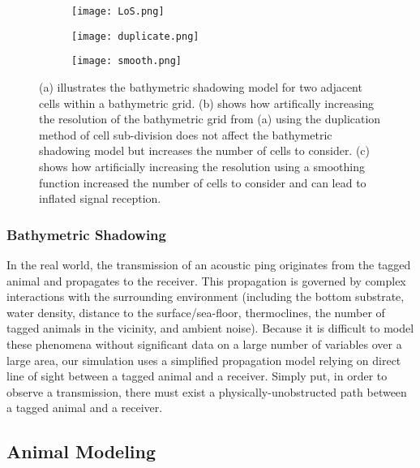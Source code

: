 \begin{figure}[ht]
	\begin{subfigure}{.5\textwidth}
		\centering
		\texttt{[image: LoS.png]}
		\caption{
			\label{resolutionScale}}
		\label{LoS}
	\end{subfigure}%
	\begin{subfigure}{.5\textwidth}
		\centering
		\texttt{[image: duplicate.png]}
		\caption{
			\label{duplicate}}
	\end{subfigure}
	\begin{subfigure}{.5\textwidth}
		\centering
		\texttt{[image: smooth.png]}
		\caption{
			\label{smooth}}
	\end{subfigure}
	\caption{(a) illustrates the bathymetric shadowing model for two adjacent cells within a bathymetric grid.  (b) shows how artifically increasing the resolution of the bathymetric grid from (a) using the duplication method of cell sub-division does not affect the bathymetric shadowing model but increases the number of cells to consider.  (c) shows how artificially increasing the resolution using a smoothing function increased the number of cells to consider and can lead to inflated signal reception.}
\end{figure}


\subsubsection{Bathymetric Shadowing}
\label{bathymetricShadowing}
In the real world, the transmission of an acoustic ping originates from the tagged animal and propagates to the receiver.  This propagation is governed by complex interactions with the surrounding environment (including the bottom substrate, water density, distance to the surface/sea-floor, thermoclines, the number of tagged animals in the vicinity, and ambient noise).  Because it is difficult to model these phenomena without significant data on a large number of variables over a large area, our simulation uses a simplified propagation model relying on direct line of sight between a tagged animal and a receiver.  Simply put, in order to observe a transmission, there must exist a physically-unobstructed path between a tagged animal and a receiver.  




\subsection{Animal Modeling}
\label{animalModeling}

